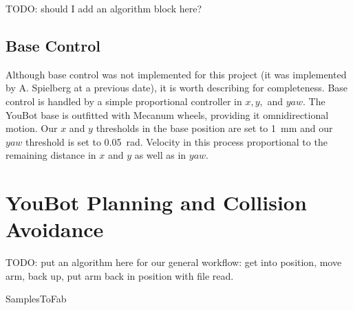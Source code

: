 \documentclass[conference]{acmsiggraph}
\makeatletter
\def\BState{\State\hskip-\ALG@thistlm}
\makeatother
\begin{document}
TODO: should I add an algorithm block here?


\subsection{Base Control}
Although base control was not implemented for this project (it was implemented by A. Spielberg at a previous date), it is worth describing for completeness.  Base control is handled by a simple proportional controller in $x, y,$ and $yaw$.   The YouBot base is outfitted with Mecanum wheels, providing it omnidirectional motion.  Our $x$ and $y$ thresholds in the base position are set to 1~mm and our $yaw$ threshold is set to 0.05~rad.  Velocity in this process proportional to the remaining distance in $x$ and $y$ as well as in $yaw$.

\section{YouBot Planning and Collision Avoidance}
TODO: put an algorithm here for our general workflow: get into position, move arm, back up, put arm back in position with file read.

\begin{algorithm}
\caption{SamplesToFab}\label{alg:samplestofab}
\end{algorithm}
\end{document}
